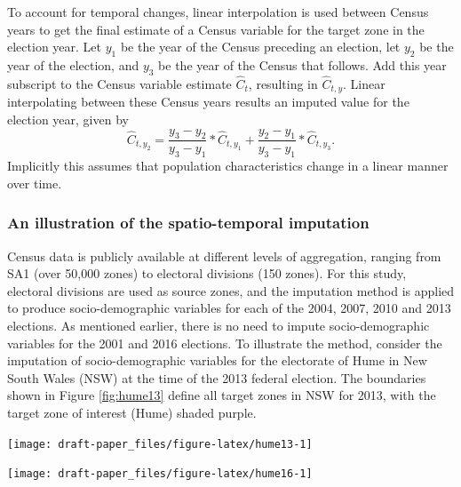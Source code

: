 \documentclass[11pt,a4paper,]{article}
\let\origfigure\figure
\let\endorigfigure\endfigure
\renewenvironment{figure}[1][2] {
    \expandafter\origfigure\expandafter[htbp]
} {
    \endorigfigure
}
\begin{document}
\enlargethispage*{0.5cm}

To account for temporal changes, linear interpolation is used between
Census years to get the final estimate of a Census variable for the
target zone in the election year. Let \(y_1\) be the year of the Census
preceding an election, let \(y_2\) be the year of the election, and
\(y_3\) be the year of the Census that follows. Add this year subscript
to the Census variable estimate \(\hat{C}_t\), resulting in
\(\hat{C}_{t,y}\). Linear interpolating between these Census years
results an imputed value for the election year, given by \[
  \hat{C}_{t,y_2} = \frac{y_3-y_2}{y_3-y_1} * \hat{C}_{t,y_1} +
    \frac{y_2-y_1}{y_3-y_1} * \hat{C}_{t,y_3}.
\] Implicitly this assumes that population characteristics change in a
linear manner over time.

\subsubsection*{An illustration of the spatio-temporal
imputation}\label{an-illustration-of-the-spatio-temporal-imputation}

Census data is publicly available at different levels of aggregation,
ranging from SA1 (over 50,000 zones) to electoral divisions (150 zones).
For this study, electoral divisions are used as source zones, and the
imputation method is applied to produce socio-demographic variables for
each of the 2004, 2007, 2010 and 2013 elections. As mentioned earlier,
there is no need to impute socio-demographic variables for the 2001 and
2016 elections. To illustrate the method, consider the imputation of
socio-demographic variables for the electorate of Hume in New South
Wales (NSW) at the time of the 2013 federal election. The boundaries
shown in Figure \ref{fig:hume13} define all target zones in NSW for
2013, with the target zone of interest (Hume) shaded purple.

\begin{figure}[h]

{\centering \texttt{[image: draft-paper\_files/figure-latex/hume13-1]} 

}

\caption{Some of the electoral boundaries in NSW for 2013, with the electoral boundary for Hume shown in purple.}\label{fig:hume13}
\end{figure}

\begin{figure}[h]

{\centering \texttt{[image: draft-paper\_files/figure-latex/hume16-1]} 

}

\caption{Census division boundaries in NSW for 2016, with the 2013 electoral boundary for Hume, shown in purple. The purple region is not contained within a single Census division.}\label{fig:hume16}
\end{figure}
\end{document}
